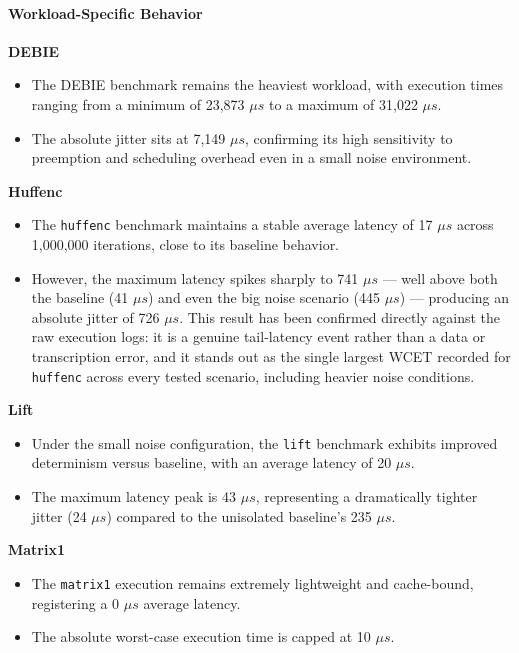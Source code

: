 \paragraph{Workload-Specific
Behavior}\label{workload-specific-behavior-5}

\textbf{DEBIE}

\begin{itemize}
\item
  The DEBIE benchmark remains the heaviest workload, with execution
  times ranging from a minimum of 23,873 $\mu s$ to a maximum of 31,022 $\mu s$.
\item
  The absolute jitter sits at 7,149 $\mu s$, confirming its high sensitivity
  to preemption and scheduling overhead even in a small noise
  environment.
\end{itemize}

\textbf{Huffenc}

\begin{itemize}
\item
  The \texttt{huffenc} benchmark maintains a stable average latency of
  17 $\mu s$ across 1,000,000 iterations, close to its baseline behavior.
\item
  However, the maximum latency spikes sharply to 741 $\mu s$ --- well above
  both the baseline (41 $\mu s$) and even the big noise scenario (445 $\mu s$) ---
  producing an absolute jitter of 726 $\mu s$. This result has been confirmed
  directly against the raw execution logs: it is a genuine tail-latency
  event rather than a data or transcription error, and it stands out as
  the single largest WCET recorded for \texttt{huffenc} across every
  tested scenario, including heavier noise conditions.
\end{itemize}

\textbf{Lift}

\begin{itemize}
\item
  Under the small noise configuration, the \texttt{lift} benchmark
  exhibits improved determinism versus baseline, with an average latency
  of 20 $\mu s$.
\item
  The maximum latency peak is 43 $\mu s$, representing a dramatically tighter
  jitter (24 $\mu s$) compared to the unisolated baseline's 235 $\mu s$.
\end{itemize}

\textbf{Matrix1}

\begin{itemize}
\item
  The \texttt{matrix1} execution remains extremely lightweight and
  cache-bound, registering a 0 $\mu s$ average latency.
\item
  The absolute worst-case execution time is capped at 10 $\mu s$.
\end{itemize}

